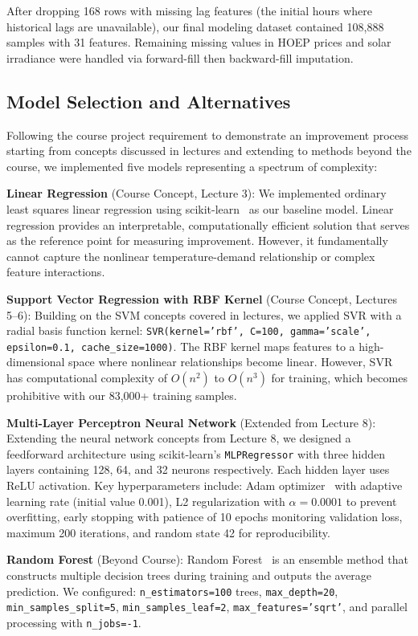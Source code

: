 \documentclass[conference]{IEEEtran}
\begin{document}
After dropping 168 rows with missing lag features (the initial hours where historical lags are unavailable), our final modeling dataset contained 108,888 samples with 31 features. Remaining missing values in HOEP prices and solar irradiance were handled via forward-fill then backward-fill imputation.

\subsection{Model Selection and Alternatives}

Following the course project requirement to demonstrate an improvement process starting from concepts discussed in lectures and extending to methods beyond the course, we implemented five models representing a spectrum of complexity:

\textbf{Linear Regression} (Course Concept, Lecture 3): We implemented ordinary least squares linear regression using scikit-learn~\cite{sklearn} as our baseline model. Linear regression provides an interpretable, computationally efficient solution that serves as the reference point for measuring improvement. However, it fundamentally cannot capture the nonlinear temperature-demand relationship or complex feature interactions.

\textbf{Support Vector Regression with RBF Kernel} (Course Concept, Lectures 5--6): Building on the SVM concepts covered in lectures, we applied SVR with a radial basis function kernel: \texttt{SVR(kernel='rbf', C=100, gamma='scale', epsilon=0.1, cache\_size=1000)}. The RBF kernel maps features to a high-dimensional space where nonlinear relationships become linear. However, SVR has computational complexity of $O(n^2)$ to $O(n^3)$ for training, which becomes prohibitive with our 83,000+ training samples.

\textbf{Multi-Layer Perceptron Neural Network} (Extended from Lecture 8): Extending the neural network concepts from Lecture 8, we designed a feedforward architecture using scikit-learn's \texttt{MLPRegressor} with three hidden layers containing 128, 64, and 32 neurons respectively. Each hidden layer uses ReLU activation. Key hyperparameters include: Adam optimizer~\cite{adam} with adaptive learning rate (initial value 0.001), L2 regularization with $\alpha=0.0001$ to prevent overfitting, early stopping with patience of 10 epochs monitoring validation loss, maximum 200 iterations, and random state 42 for reproducibility.

\textbf{Random Forest} (Beyond Course): Random Forest~\cite{rf} is an ensemble method that constructs multiple decision trees during training and outputs the average prediction. We configured: \texttt{n\_estimators=100} trees, \texttt{max\_depth=20}, \texttt{min\_samples\_split=5}, \texttt{min\_samples\_leaf=2}, \texttt{max\_features='sqrt'}, and parallel processing with \texttt{n\_jobs=-1}.
\end{document}

